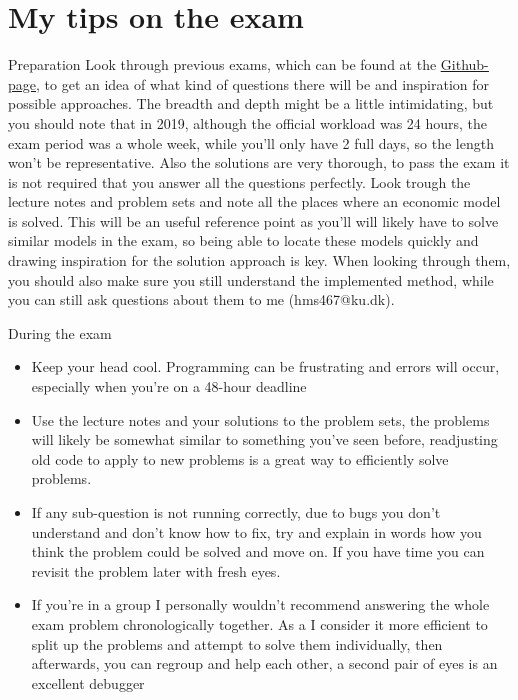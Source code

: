 \documentclass[10pt,danish,t,10pt]{beamer}
\begin{document}
\section{My tips on the exam}
\begin{frame}{Preparation}
    \vspace{-0.3cm}
    Look through previous exams, which can be found at the \href{https://github.com/NumEconCopenhagen/lectures-2021/tree/master/exam}{\underline{Github-page}}, to get an idea of what kind of questions there will be and inspiration for possible approaches. The breadth and depth might be a little intimidating, but you should note that in 2019, although the official workload was 24 hours, the exam period was a whole week, while you'll only have 2 full days, so the length won't be representative. Also the  solutions are very thorough, to pass the exam it is not required that you answer all the questions perfectly. \newline
    Look trough the lecture notes and problem sets and note all the places where an economic model is solved. This will be an useful reference point as you'll will likely have to solve similar models in the exam, so being able to locate these models quickly and drawing inspiration for the solution approach is key. When looking through them, you should also make sure you still understand the implemented method, while you can still ask questions about them to me (hms467@ku.dk). \newline
\end{frame}

\begin{frame}{During the exam}
    \begin{itemize}
        \item Keep your head cool. Programming can be frustrating and errors will occur, especially when you're on a 48-hour deadline
        \item Use the lecture notes and your solutions to the problem sets, the problems will likely be somewhat similar to something you've seen before, readjusting old code to apply to new problems is a great way to efficiently solve problems. 
        \item If any sub-question is not running correctly, due to bugs you don't understand and don't know how to fix, try and explain in words how you think the problem could be solved and move on. If you have time you can revisit the problem later with fresh eyes.
        \item If you're in a group I personally wouldn't recommend answering the whole exam problem chronologically together. As a I  consider it more efficient to split up the problems and attempt to solve them individually, then afterwards, you can regroup and help each other, a second pair of eyes is an excellent debugger
    \end{itemize}
\end{frame}
\end{document}
